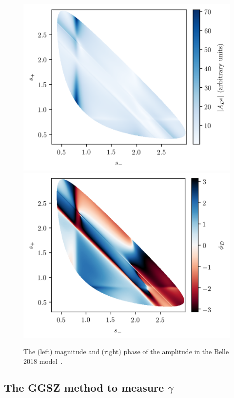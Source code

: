 \begin{figure}[tb]
    \centering
    \includegraphics[width=0.48\columnwidth]{figures/theory/ampD.png}
    \includegraphics[width=0.48\columnwidth]{figures/theory/phiD.png}
    \caption{The (left) magnitude and (right) phase of the \DtoKspipi amplitude in the Belle 2018 model~\cite{Belle2018}.}
    \label{fig:amplitude_models}
\end{figure}


\subsection{\texorpdfstring{The GGSZ method to measure $\gamma$}{The GGSZ method to measure gamma}} %
\label{sub:the_ggsz_method_to_measure_gamma}

